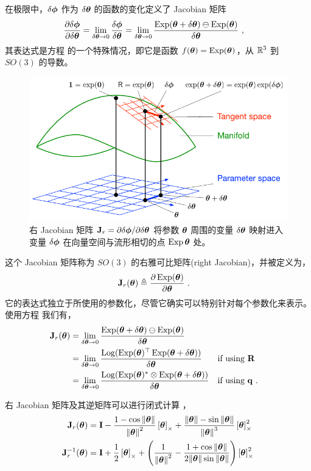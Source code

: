 在极限中，$\delta\bfphi$ 作为 $\dth$ 的函数的变化定义了 Jacobian 矩阵
%
\begin{align}
\dpar{\delta\bfphi}{\dth} 
&= \lim_{\dth\to0}\frac{\delta\bfphi}{\dth} 
= \lim_{\dth\to0}\frac{\Exp(\bth+\dth) \ominus \Exp(\bth)}{\dth} 
~,
\end{align}
%
其表达式是方程  的一个特殊情况，即它是函数 $f(\bth)=\Exp(\bth)$，从 $\bbR^3$ 到 $SO(3)$ 的导数。
%
\begin{figure}[tbp]
\begin{center}
\includegraphics{figures/right_jac}
\caption{右 Jacobian 矩阵 $\bfJ_r=\dparil{\delta\bfphi}{\delta\bftheta}$ 将参数 $\bftheta$ 周围的变量 $\delta\bftheta$ 映射进入变量 $\delta\bfphi$ 在向量空间与流形相切的点 $\Exp{\bftheta}$ 处。}
\label{fig:right_jac}
\end{center}
\end{figure}
%
这个 Jacobian 矩阵称为 $SO(3)$ 的右雅可比矩阵(right Jacobian)，并被定义为，
%
\begin{align}
\bfJ_r(\bth) &\te \dpar{\Exp(\bth)}{\bth} 
~.
\end{align}
%
它的表达式独立于所使用的参数化，尽管它确实可以特别针对每个参数化来表示。使用方程  我们有，
%
\begin{align}
\bfJ_r(\bth) &= \lim_{\dth\to0}\frac{\Exp(\bth+\dth)\ominus\Exp(\bth)}{\dth} \\
 &= \lim_{\dth\to0}\frac{\Log(\Exp(\bth)\tr\Exp(\bth+\dth))}{\dth} && \textrm{if using $\bfR$} \\
 &= \lim_{\dth\to0}\frac{\Log(\Exp(\bth)^*\ot\Exp(\bth+\dth))}{\dth} && \textrm{if using $\bfq$} 
 ~.
\end{align}
%

右 Jacobian 矩阵及其逆矩阵可以进行闭式计算 \citep[page 40]{CHIRIKJIAN-12}，
%
\begin{align}
\bfJ_r(\bth) &= \bfI - \frac{1-\cos\nth}{\nth^2}\hatx{\bth} + \frac{\nth-\sin\nth}{\nth^3}\hatx{\bth}^2 \\
\bfJ_r\inv(\bth) &= \bfI + \frac12\hatx{\bth} + \left(\frac1{\nth^2} - \frac{1+\cos\nth}{2\nth\sin\nth}\right)\hatx{\bth}^2
\end{align}



